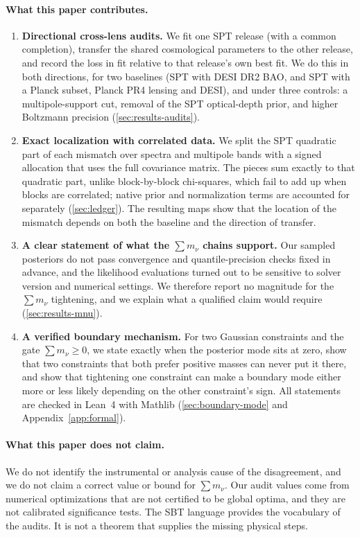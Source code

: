 \documentclass[11pt]{article}
\theoremstyle{remark}
\newcommand{\mnu}{\sum m_\nu}
\numberwithin{equation}{section}
\begin{document}
\paragraph{What this paper contributes.}
\begin{enumerate}[leftmargin=*, itemsep=2pt]
  \item \textbf{Directional cross-lens audits.} We fit one SPT release (with a common completion), transfer the shared cosmological parameters to the other release, and record the loss in fit relative to that release's own best fit. We do this in both directions, for two baselines (SPT with DESI DR2 BAO, and SPT with a Planck subset, Planck PR4 lensing and DESI), and under three controls: a multipole-support cut, removal of the SPT optical-depth prior, and higher Boltzmann precision (\cref{sec:results-audits}).
  \item \textbf{Exact localization with correlated data.} We split the SPT quadratic part of each mismatch over spectra and multipole bands with a signed allocation that uses the full covariance matrix. The pieces sum exactly to that quadratic part, unlike block-by-block chi-squares, which fail to add up when blocks are correlated; native prior and normalization terms are accounted for separately (\cref{sec:ledger}). The resulting maps show that the location of the mismatch depends on both the baseline and the direction of transfer.
  \item \textbf{A clear statement of what the $\mnu$ chains support.} Our sampled posteriors do not pass convergence and quantile-precision checks fixed in advance, and the likelihood evaluations turned out to be sensitive to solver version and numerical settings. We therefore report no magnitude for the $\mnu$ tightening, and we explain what a qualified claim would require (\cref{sec:results-mnu}).
  \item \textbf{A verified boundary mechanism.} For two Gaussian constraints and the gate $\mnu\ge0$, we state exactly when the posterior mode sits at zero, show that two constraints that both prefer positive masses can never put it there, and show that tightening one constraint can make a boundary mode either more or less likely depending on the other constraint's sign. All statements are checked in Lean~4 with Mathlib \cite{lean4,mathlib} (\cref{sec:boundary-mode} and Appendix~\ref{app:formal}).
\end{enumerate}

\paragraph{What this paper does not claim.}
We do not identify the instrumental or analysis cause of the disagreement, and we do not claim a correct value or bound for $\mnu$. Our audit values come from numerical optimizations that are not certified to be global optima, and they are not calibrated significance tests. The SBT language provides the vocabulary of the audits. It is not a theorem that supplies the missing physical steps.
\end{document}

